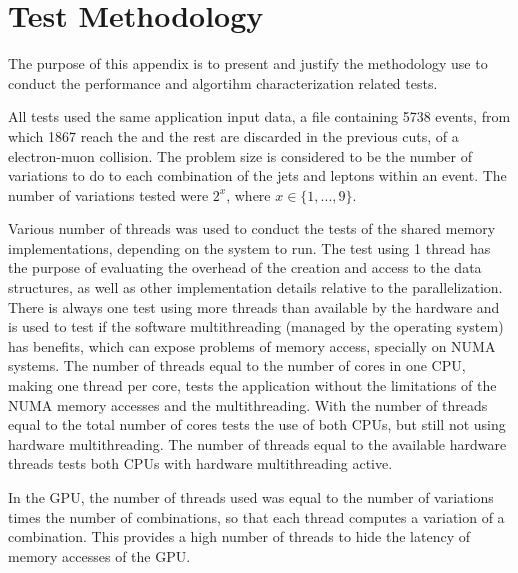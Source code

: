 \appendix
{}
\chapter{Test Methodology}
\label{App:TestMethodology}

The purpose of this appendix is to present and justify the methodology use to conduct the performance and algortihm characterization related tests.

All tests used the same application input data, a file containing 5738 events, from which 1867 reach the \ttDilepKinFit and the rest are discarded in the previous cuts, of a electron-muon collision. The problem size is considered to be the number of variations to do to each combination of the jets and leptons within an event. The number of variations tested were $2^{x}$, where $x \in \{1, ..., 9\}$.

Various number of threads was used to conduct the tests of the shared memory implementations, depending on the system to run. The test using 1 thread has the purpose of evaluating the overhead of the creation and access to the data structures, as well as other implementation details relative to the parallelization. There is always one test using more threads than available by the hardware and is used to test if the software multithreading (managed by the operating system) has benefits, which can expose problems of memory access, specially on NUMA systems. The number of threads equal to the number of cores in one CPU, making one thread per core, tests the application without the limitations of the NUMA memory accesses and the multithreading. With the number of threads equal to the total number of cores tests the use of both CPUs, but still not using hardware multithreading. The number of threads equal to the available hardware threads tests both CPUs with hardware multithreading active.

In the GPU, the number of threads used was equal to the number of variations times the number of combinations, so that each thread computes a variation of a combination. This provides a high number of threads to hide the latency of memory accesses of the GPU.


